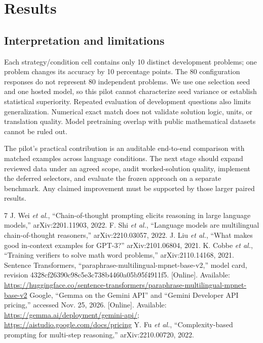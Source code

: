 \documentclass[conference]{IEEEtran}
\begin{document}
\section{Results}


\subsection{Interpretation and limitations}
Each strategy/condition cell contains only 10 distinct development problems; one problem changes its accuracy by 10 percentage points. The 80 configuration responses do not represent 80 independent problems. We use one selection seed and one hosted model, so this pilot cannot characterize seed variance or establish statistical superiority. Repeated evaluation of development questions also limits generalization. Numerical exact match does not validate solution logic, units, or translation quality. Model pretraining overlap with public mathematical datasets cannot be ruled out.

The pilot's practical contribution is an auditable end-to-end comparison with matched examples across language conditions. The next stage should expand reviewed data under an agreed scope, audit worked-solution quality, implement the deferred selectors, and evaluate the frozen approach on a separate benchmark. Any claimed improvement must be supported by those larger paired results.

\begin{thebibliography}{7}
 J. Wei \emph{et al.}, ``Chain-of-thought prompting elicits reasoning in large language models,'' arXiv:2201.11903, 2022.
 F. Shi \emph{et al.}, ``Language models are multilingual chain-of-thought reasoners,'' arXiv:2210.03057, 2022.
 J. Liu \emph{et al.}, ``What makes good in-context examples for GPT-3?'' arXiv:2101.06804, 2021.
 K. Cobbe \emph{et al.}, ``Training verifiers to solve math word problems,'' arXiv:2110.14168, 2021.
 Sentence Transformers, ``paraphrase-multilingual-mpnet-base-v2,'' model card, revision 4328cf26390c98c5e3c738b4460a05b95f4911f5. [Online]. Available: \url{https://huggingface.co/sentence-transformers/paraphrase-multilingual-mpnet-base-v2}
 Google, ``Gemma on the Gemini API'' and ``Gemini Developer API pricing,'' accessed Nov. 25, 2026. [Online]. Available: \url{https://gemma.ai/deployment/gemini-api/}; \url{https://aistudio.google.com/docs/pricing}
 Y. Fu \emph{et al.}, ``Complexity-based prompting for multi-step reasoning,'' arXiv:2210.00720, 2022.
\end{thebibliography}
\end{document}

